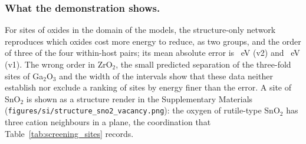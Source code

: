 \subsubsection{What the demonstration shows.}
For \numScreeningDemoScopeNScreenedSites{} sites of \numScreeningDemoScopeNHosts{} oxides in the domain of the models, the structure-only network reproduces which oxides cost more energy to reduce, as two groups, and the order of three of the four within-host pairs; its mean absolute error is \numScreeningDemoSummaryVTwoMaeEV{}~eV (v2) and \numScreeningDemoSummaryVOneMaeEV{}~eV (v1). The wrong order in ZrO$_2$, the small predicted separation of the three-fold sites of Ga$_2$O$_3$ and the width of the intervals show that these data neither establish nor exclude a ranking of sites by energy finer than the error. A site of SnO$_2$ is shown as a structure render in the Supplementary Materials (\texttt{figures/si/structure\_sno2\_vacancy.png}): the oxygen of rutile-type SnO$_2$ has three cation neighbours in a plane, the coordination that Table~\ref{tab:screening_sites} records.
